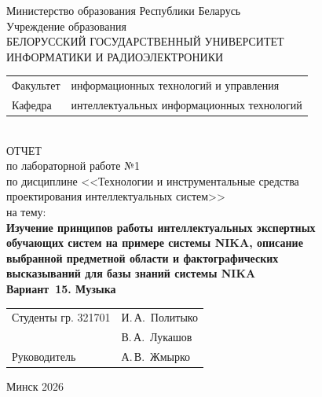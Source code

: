 \begin{titlepage}
	\begin{center}
		Министерство образования Республики Беларусь\\[1em]
		Учреждение образования\\
		БЕЛОРУССКИЙ ГОСУДАРСТВЕННЫЙ УНИВЕРСИТЕТ \\
		ИНФОРМАТИКИ И РАДИОЭЛЕКТРОНИКИ\\[1em]
		
		\begin{minipage}{\textwidth}
			\begin{flushleft}
				\begin{tabular}{ l l }
					Факультет & информационных технологий и управления\\
					Кафедра   & интеллектуальных информационных технологий
				\end{tabular}
			\end{flushleft}
		\end{minipage}\\[1em]
		
		{ОТЧЕТ}\\
		{по лабораторной работе №1}\\
		{по дисциплине <<Технологии и инструментальные средства}\\
		{проектирования интеллектуальных систем>>}\\
		{на тему:}\\[1em]
		\textbf{Изучение принципов работы интеллектуальных экспертных}\\
		\textbf{обучающих систем на примере системы NIKA, описание}\\
		\textbf{выбранной предметной области и фактографических}\\
		\textbf{высказываний для базы знаний системы NIKA}\\[0.5em]
		\textbf{Вариант~15. Музыка}\\[1em]
		
		\vspace{2em}
		\begin{tabular}{ p{}p{} }
			Студенты гр. 321701 & И.\,А.~Политыко \\
			& В.\,А.~Лукашов \\
			Руководитель & А.\,В.~Жмырко \\
		\end{tabular}
		
		\vfill
		{\normalsize Минск 2026}
	\end{center}
\end{titlepage}
